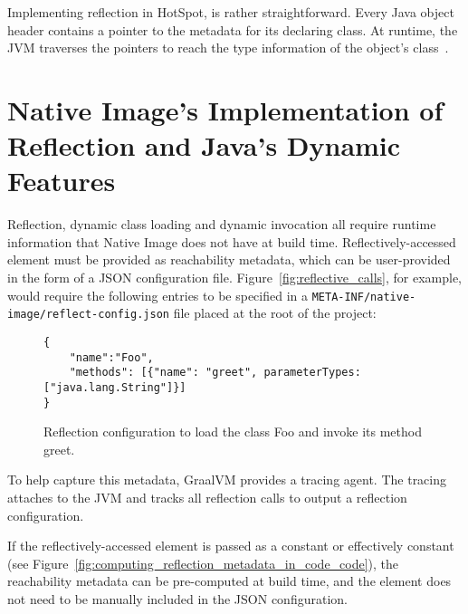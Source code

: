 Implementing reflection in HotSpot, is rather straightforward. Every Java object header contains a pointer to the metadata for its declaring class. At runtime, the JVM traverses the pointers to reach the type information of the object's class~\cite{evans_ben_reflection_nodate}.



\section{Native Image's Implementation of Reflection and Java's Dynamic Features}
Reflection, dynamic class loading and dynamic invocation all require runtime information that Native Image does not have at build time.
Reflectively-accessed element must be provided as reachability metadata, which can be user-provided in the form of a JSON configuration file.  
Figure~\ref{fig:reflective_calls}, for example, would require the following entries to be specified in a \verb|META-INF/native-image/reflect-config.json| file placed at the root of the project:

\begin{figure}[ht]
    \centering
\begin{lstlisting}
{
    "name":"Foo",
    "methods": [{"name": "greet", parameterTypes: ["java.lang.String"]}]
}    
\end{lstlisting}
    \caption{Reflection configuration to load the class Foo and invoke its method greet.}
    \label{fig:reflect_config}
\end{figure}

To help capture this metadata, GraalVM provides a tracing agent.  The tracing attaches to the JVM and tracks all reflection calls to output a reflection configuration.   

If the reflectively-accessed element is passed as a constant or effectively constant (see Figure~\ref{fig:computing_reflection_metadata_in_code_code}), the reachability metadata can be pre-computed at build time, and the element does not need to be manually included in the JSON configuration. 

